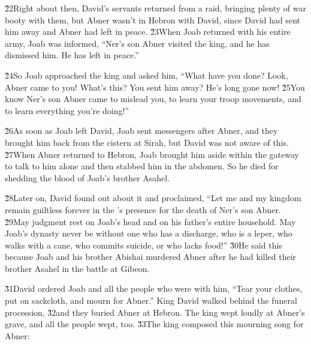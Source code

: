 \v{22}Right about then, David's servants returned from a raid, bringing plenty of war booty with them, but Abner wasn't in Hebron with David, since David had sent him away and Abner had left in peace. \v{23}When Joab returned with his entire army, Joab was informed, ``Ner's son Abner visited the king, and he has dismissed him. He has left in peace.''

\v{24}So Joab approached the king and asked him, ``What have you done? Look, Abner came to you! What's this? You sent him away? He's long gone now! \v{25}You know Ner's son Abner came to mislead you, to learn your troop movements, and to learn everything you're doing!''

\v{26}As soon as Joab left David, Joab sent messengers after Abner, and they brought him back from the cistern at Sirah, but David was not aware of this. \v{27}When Abner returned to Hebron, Joab brought him aside within the gateway to talk to him alone and then stabbed him in the abdomen. So he died for shedding the blood of Joab's brother Asahel.

\v{28}Later on, David found out about it and proclaimed, ``Let me and my kingdom remain guiltless forever in the 's presence for the death of Ner's son Abner. \v{29}May judgment rest on Joab's head and on his father's entire household. May Joab's dynasty never be without one who has a discharge, who is a leper, who walks with a cane, who commits suicide, or who lacks food!'' \v{30}He said this because Joab and his brother Abishai murdered Abner after he had killed their brother Asahel in the battle at Gibeon.

\v{31}David ordered Joab and all the people who were with him, ``Tear your clothes, put on sackcloth, and mourn for Abner.'' King David walked behind the funeral procession, \v{32}and they buried Abner at Hebron. The king wept loudly at Abner's grave, and all the people wept, too. \v{33}The king composed this mourning song for Abner:

